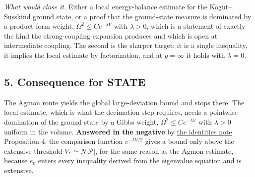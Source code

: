 \documentclass[11pt,a4paper]{article}
\begin{document}
\emph{What would close it.} Either a local energy-balance estimate for
the Kogut--Susskind ground state, or a proof that the ground-state
measure is dominated by a product-form weight,
\(\Omega^2\le Ce^{-\lambda V}\) with \(\lambda>0\), which is a statement
of exactly the kind the strong-coupling expansion produces and which is
open at intermediate coupling. The second is the sharper target: it is a
single inequality, it implies the local estimate by factorization, and
at \(g=\infty\) it holds with \(\lambda=0\).

\hypertarget{consequence-for-state}{%
\subsection{5. Consequence for STATE}\label{consequence-for-state}}

The Agmon route yields the global large-deviation bound and stops there.
The local estimate, which is what the decimation step requires, needs a
pointwise domination of the ground state by a Gibbs weight,
\(\Omega^2\le Ce^{-\lambda V}\) with \(\lambda>0\) uniform in the
volume. \textbf{Answered in the negative} by
\href{magnetic-energy-identities.md}{the identities note} Proposition 4:
the comparison function \(e^{-\lambda V/2}\) gives a bound only above
the extensive threshold \(V_*\simeq N|\mathcal P|\), for the same reason
as the Agmon estimate, because \(e_0\) enters every inequality derived
from the eigenvalue equation and is extensive.
\end{document}
